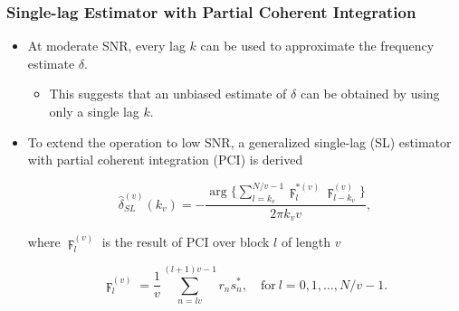 \begin{frame}
  \frametitle{Single-lag Estimator with Partial Coherent Integration}

    \begin{itemize}
    
      \item At moderate SNR, every lag $k$ can be used to approximate the frequency estimate $\delta$. 
      
      \begin{itemize}
        \item This suggests that an unbiased estimate of $\delta$ can be obtained by using only a single lag $k$.
      \end{itemize}
      
      \item To extend the operation to low SNR, a generalized single-lag (SL) estimator with partial coherent integration (PCI) is derived
      
      \begin{equation*}
        \label{eq:single_lag_estimator_w_partial_corr}
        \hat{\delta}_{SL}^{(v)}(k_v)=-\frac{\arg\big\{\sum_{l=k_v}^{N/v-1}\digamma_l^{*(v)}\digamma_{l-k_v}^{(v)}\big\}}{2\pi k_vv},
      \end{equation*}

      where $\digamma_{l}^{(v)}$ is the result of PCI over block $l$
      of length $v$

      \begin{equation*}
        \label{eq:coherent_integrator}
        \digamma_l^{(v)}=\frac{1}{v}\sum_{n=lv}^{(l+1)v-1}r_ns_n^*, \quad \text{for}~l=0,1,\ldots,N/v{-}1.
      \end{equation*}


    \end{itemize}



\end{frame}



